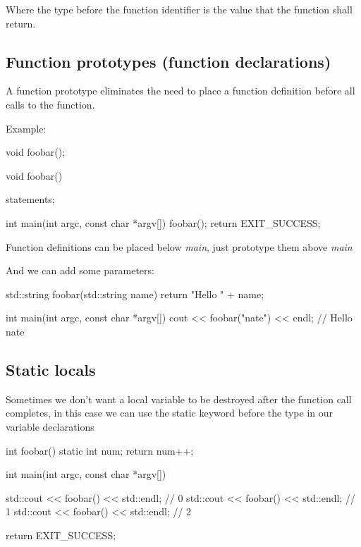 \documentclass{report}
\begin{document}
    \bigbreak \noindent 
    Where the type before the function identifier is the value that the function shall return.
    \bigbreak \noindent 
    \subsection{Function prototypes (function declarations)}
    \bigbreak \noindent 
    \begin{concept}
 A function prototype eliminates the need to place a function definition before all calls to the function.
	\end{concept}
    \bigbreak \noindent 
    Example:
    \bigbreak \noindent 
    
    \begin{cppcode}
void foobar();

void foobar() {
    statements;

}
int main(int argc, const char *argv[]){ foobar(); return EXIT_SUCCESS; }
    \end{cppcode}
    
    \bigbreak \noindent 
    \begin{notebox}
        Function definitions can be placed below \textit{main}, just prototype them above \textit{main}
    \end{notebox}
    
    \bigbreak \noindent 
    And we can add some parameters:
    \bigbreak \noindent 
    
    \begin{cppcode}
std::string foobar(std::string name) {
    return "Hello " + name;
}  

int main(int argc, const char *argv[]){ cout << foobar("nate") << endl; } // Hello nate 
    \end{cppcode}
    

    \pagebreak \bigbreak \noindent 
    \subsection{Static locals}
    \bigbreak \noindent 
    Sometimes we don't want a local variable to be destroyed after the function call completes, in this case we can use the static keyword before the type in our variable declarations
    \bigbreak \noindent 
    
    \begin{cppcode}
int foobar() { static int num; return num++; }

int main(int argc, const char *argv[]) {
    std::cout << foobar() << std::endl; // 0
    std::cout << foobar() << std::endl; // 1
    std::cout << foobar() << std::endl; // 2

    return EXIT_SUCCESS;
}
    \end{cppcode}
    
\end{document}
